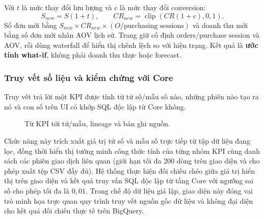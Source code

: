 Với $t$ là mức thay đổi lưu lượng và $c$ là mức thay đổi conversion:
\[
S_{new}=S(1+t),\qquad CR_{new}=\operatorname{clip}(CR(1+c),0,1).
\]
Số đơn mới bằng $S_{new}\times CR_{new}\times(O/\text{purchasing sessions})$ và doanh thu mới bằng số đơn mới nhân AOV lịch sử. Trang giữ cố định orders/purchase session và AOV, rồi dùng waterfall để hiển thị chênh lệch so với hiện trạng. Kết quả là \textbf{ước tính what-if}, không phải doanh thu thực hoặc forecast. 

\subsubsection{Truy vết số liệu và kiểm chứng với Core}

Truy vết trả lời một KPI được tính từ tử số/mẫu số nào, những phiên nào tạo ra nó và con số trên UI có khớp SQL độc lập từ Core không.

\begin{figure}[H]
  \centering
  \caption{Từ KPI tới tử/mẫu, lineage và bản ghi nguồn.}
  \label{fig:ui-trace}
\end{figure}

Chức năng này trích xuất giá trị tử số và mẫu số trực tiếp từ tập dữ liệu đang lọc, đồng thời hiển thị tường minh công thức tính của từng nhóm KPI cùng danh sách các phiên giao dịch liên quan (giới hạn tối đa 200 dòng trên giao diện và cho phép xuất tệp CSV đầy đủ). Hệ thống thực hiện đối chiếu chéo giữa giá trị hiển thị trên giao diện và kết quả truy vấn SQL độc lập từ tầng Core với ngưỡng sai số cho phép tối đa là $0,01$. Trong chế độ dữ liệu giả lập, giao diện này đóng vai trò minh họa trực quan quy trình truy vết nguồn gốc dữ liệu và không đại diện cho kết quả đối chiếu thực tế trên BigQuery.